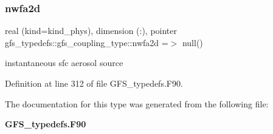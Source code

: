 \mbox{\label{structgfs__typedefs_1_1gfs__coupling__type_aa523d3b9680607138915be3e68992d45}} 
\subsubsection{nwfa2d}
{\footnotesize\ttfamily real (kind=kind\+\_\+phys), dimension  (\+:), pointer gfs\+\_\+typedefs\+::gfs\+\_\+coupling\+\_\+type\+::nwfa2d =$>$ null()}



instantaneous sfc aerosol source 



Definition at line 312 of file G\+F\+S\+\_\+typedefs.\+F90.



The documentation for this type was generated from the following file\+:\begin{DoxyCompactItemize}
\item 
\textbf{ G\+F\+S\+\_\+typedefs.\+F90}\end{DoxyCompactItemize}
